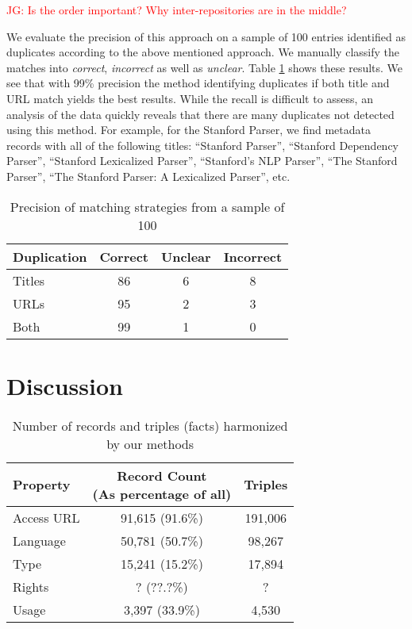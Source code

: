 \documentclass[11pt]{article}
\begin{document}
\textcolor{red}{JG: Is the order important? Why inter-repositories are in the middle?}

We evaluate the precision of this approach on a sample of 100 entries identified as duplicates according to the above mentioned approach. We manually classify the matches into \emph{correct}, \emph{incorrect} as well as \emph{unclear}. Table \ref{tab:dupe-precision} shows these results. We see that with 99\% precision the method identifying duplicates if both title and URL match yields the best results. While the recall is difficult to assess, an analysis of the data quickly reveals that there are many duplicates not detected using this method. For example, for the Stanford Parser, we find metadata records with all of the following titles: ``Stanford Parser'', ``Stanford Dependency Parser'',  ``Stanford Lexicalized Parser'', ``Stanford's NLP Parser'', ``The Stanford Parser'', ``The Stanford Parser: A Lexicalized Parser'', etc.



\begin{table}
    \begin{tabular}{l|ccc}
        Duplication & Correct & Unclear & Incorrect \\
        \hline                    
        Titles      &    86   &   6     &    8      \\ 
        URLs        &    95   &   2     &    3      \\
        Both        &    99   &   1     &    0      \\
    \end{tabular}
    \caption{\label{tab:dupe-precision}Precision of matching strategies from a
    sample of 100}
\end{table}

\section{Discussion}
\label{discussion}

\begin{table}
    \begin{center}
    \begin{tabular}{l|cc}
        Property   &  \thead{Record Count\\(As percentage of all)} & Triples \\
        \hline
        Access URL &  91,615 (91.6\%) & 191,006  \\
        Language   &  50,781 (50.7\%) & 98,267   \\
        Type       &  15,241 (15.2\%) & 17,894   \\
        Rights     &       ? (??.?\%) & ?        \\
        Usage      &   3,397 (33.9\%) & 4,530    \\ 
    \end{tabular}
\end{center}
\caption{\label{tab:total}Number of records and triples (facts) harmonized by our
    methods}
\end{table}
        
\end{document}
